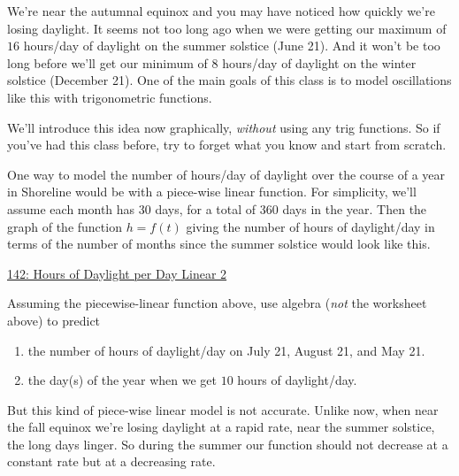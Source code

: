 \documentclass{ximera}
\begin{document}
\begin{example}  \label{Ex:KDreDFerdfdsa}
We're near the autumnal equinox and you may have noticed how quickly we're losing daylight. It seems not too long ago when we were getting our maximum of $16$ hours/day of daylight on the summer solstice (June 21). And it won't be too long before we'll get our minimum of $8$ hours/day of daylight on the winter solstice (December 21). One of the main goals of this class is to model oscillations like this with trigonometric functions.

We'll introduce this idea now graphically, \emph{without} using any trig functions. So if you've had this class before, try to forget what you know and start from scratch.

One way to model the number of hours/day of daylight over the course of a year in Shoreline would be with a piece-wise linear function. For simplicity, we'll assume each month has 30 days, for a total of 360 days in the year. Then the graph of the function $h=f(t)$ giving the number of hours of daylight/day in terms of the number of months since the summer solstice would look like this.

\begin{onlineOnly}
    \begin{center}
\end{center}
\end{onlineOnly}

\href{https://www.desmos.com/calculator/swvhkxim4w}{142: Hours of Daylight per Day Linear 2}

\begin{question}  \label{Q98dfrdedsfdsf}

Assuming the piecewise-linear function above, use algebra (\emph{not} the worksheet above) to predict 
\begin{enumerate}
\item the number of hours of daylight/day on July 21, August 21, and May 21.

\item the day(s) of the year when we get $10$ hours of daylight/day.
\end{enumerate}

But this kind of piece-wise linear model is not accurate. Unlike now, when near the fall equinox  we're losing daylight at a rapid rate, near the summer solstice, the long days linger. So during the summer our function should not decrease at a constant rate but at a decreasing rate.


\end{question}
\end{example}
\end{document}
